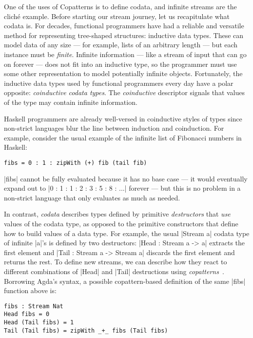 One of the uses of Copatterns is to define codata, and infinite streams are the cliché example.
Before starting our stream journey, let us recapitulate what codata is.
For decades, functional programmers have had a reliable and versatile method for representing tree-shaped structures: inductive data types.
These can model data of any size --- for example, lists of an arbitrary length --- but each instance must be \emph{finite}.
Infinite information --- like a stream of input that can go on forever --- does not fit into an inductive type, so the programmer must use some other representation to model potentially infinite objects.
Fortunately, the inductive data types used by functional programmers every day have a polar opposite: \emph{coinductive codata types}.
The \emph{coinductive} descriptor signals that values of the type may contain infinite information.

Haskell programmers are already well-versed in coinductive styles of types since non-strict languages blur the line between induction and coinduction.
For example, consider the usual example of the infinite list of Fibonacci numbers in Haskell:
\begin{verbatim}
fibs = 0 : 1 : zipWith (+) fib (tail fib)
\end{verbatim}

\hs|fibs| cannot be fully evaluated because it has no base case --- it would eventually expand out to \hs|0 : 1 : 1 : 2 : 3 : 5 : 8 : ...| forever --- but this is no problem in a non-strict language that only evaluates as much as needed.

In contrast, \emph{codata} describes types defined by primitive \emph{destructors} that \emph{use} values of the codata type, as opposed to the primitive constructors that define how to build values of a data type.
For example, the usual \agda|Stream a| codata type of infinite \agda|a|'s is defined by two destructors: \agda|Head : Stream a -> a| extracts the first element and \agda|Tail : Stream a -> Stream a| discards the first element and returns the rest.
To define new streams, we can describe how they react to different combinations of \agda|Head| and \agda|Tail| destructions using \emph{copatterns}~\cite{APTS2013C}.
Borrowing Agda's syntax, a possible copattern-based definition of the same \agda|fibs| function above is:

\begin{verbatim}
fibs : Stream Nat
Head fibs = 0
Head (Tail fibs) = 1
Tail (Tail fibs) = zipWith _+_ fibs (Tail fibs)
\end{verbatim}


